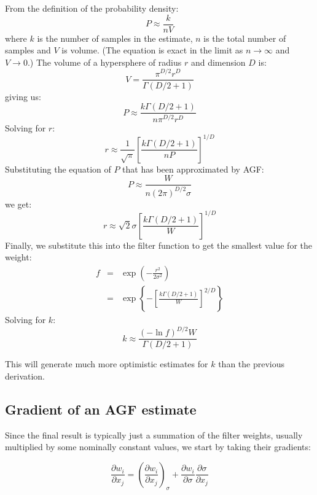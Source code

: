 \documentclass[12pt]{report}
\begin{document}
\begin{flushleft}
From the definition of the probability density:
\begin{equation}
P \approx \frac{k}{nV}
\end{equation}
where $k$ is the number of samples in the estimate,
$n$ is the total number of samples and $V$ is volume.
(The equation is exact in the limit as $n \rightarrow \infty$
and $V \rightarrow 0$.)
The volume of a hypersphere of radius $r$ and dimension $D$ is:
\begin{equation}
V = \frac{\pi^{D/2} r^D}{\Gamma(D/2+1)}
\end{equation}
giving us:
\begin{equation}
P \approx \frac{k \Gamma(D/2 + 1)}{n \pi^{D/2} r^D}
\end{equation}
Solving for $r$:
\begin{equation}
r \approx \frac{1}{\sqrt{\pi}}\left [\frac{k \Gamma(D/2+1)}{nP} \right]^{1/D}
\end{equation}
Substituting the equation of $P$ that has been approximated by
AGF:
\begin{equation}
P \approx \frac{W}{n(2\pi)^{D/2}\sigma}
\end{equation}
we get:
\begin{equation}
r \approx \sqrt{2} \sigma \left [\frac{k \Gamma(D/2 + 1)}{W} \right ]^{1/D}
\end{equation}
Finally, we substitute this into the filter function to
get the smallest value for the weight:
\begin{eqnarray}
f & = & \exp \left (-\frac{r^2}{2\sigma^2} \right ) \\
& = & \exp \left \lbrace -\left [ \frac{k \Gamma(D/2+1)}{W} \right ]^{2/D} \right \rbrace
\end{eqnarray}
Solving for $k$:
\begin{equation}
k \approx \frac{(-\ln f)^{D/2} W}{\Gamma(D/2 + 1)}
\end{equation}

This will generate much more optimistic estimates for $k$ than the
previous derivation.

\subsection{Gradient of an AGF estimate}

Since the final result is typically just a summation of the filter weights, 
usually multiplied by some nominally constant values, we start by taking their gradients: 

\begin{equation}
  \frac{\partial w_i}{\partial x_j} = \left (\frac{\partial w_i}{\partial x_j} \right )_\sigma
		+ \frac{\partial w_i}{\partial \sigma} \frac{\partial \sigma}{\partial x_j}
  \label{gradagf:grad_w}
\end{equation}


\end{flushleft}
\end{document}
